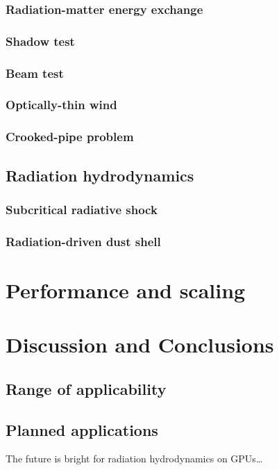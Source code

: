 \documentclass[fleqn,usenatbib]{mnras}
\begin{document}
\subsubsection{Radiation-matter energy exchange}
\subsubsection{Shadow test}
\subsubsection{Beam test}
\subsubsection{Optically-thin wind}
\subsubsection{Crooked-pipe problem}

\subsection{Radiation hydrodynamics}
\subsubsection{Subcritical radiative shock}
\subsubsection{Radiation-driven dust shell}

\section{Performance and scaling}
\label{section:performance}

\section{Discussion and Conclusions}
\label{section:discussion}
\subsection{Range of applicability}
\subsection{Planned applications}

The future is bright for radiation hydrodynamics on GPUs\dots
\end{document}
